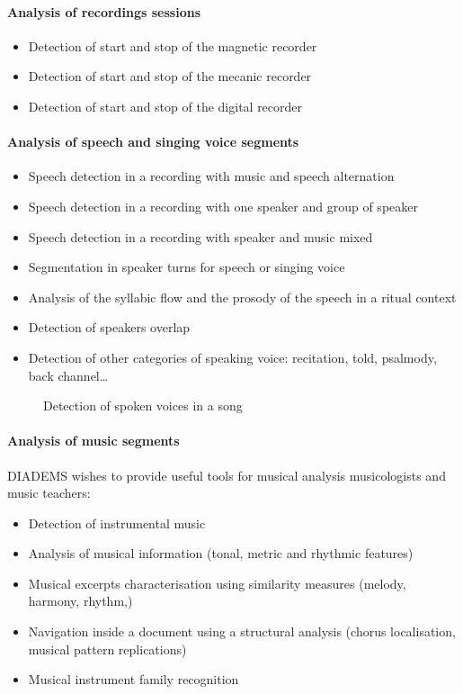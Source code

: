 \documentclass{sig-alternate}
\begin{document}
\paragraph{Analysis of recordings sessions}
\begin{itemize}
\item Detection of start and stop of the magnetic recorder
\item Detection of start and stop of the mecanic recorder
\item Detection of start and stop of the digital recorder
\end{itemize}
\paragraph{Analysis of speech and singing voice segments}
\begin{itemize}
\item Speech detection in a recording with music and speech
  alternation
\item Speech detection in a recording with one speaker and group of
  speaker
\item Speech detection in a recording with speaker and music mixed
\item Segmentation in speaker turns for speech or singing voice
\item Analysis of the syllabic flow and the prosody of the speech in a
  ritual context
\item Detection of speakers overlap
\item Detection of other categories of speaking voice: recitation,
  told, psalmody, back channel…
\end{itemize}

\begin{figure}
  \centering
  
  \caption{Detection of spoken voices in a song}
  \label{fig:speech_detection}
\end{figure}

\paragraph{Analysis of music segments}

DIADEMS wishes to provide useful tools for musical analysis musicologists and music teachers:
\begin{itemize}
\item Detection of instrumental music
\item Analysis of musical information (tonal, metric and rhythmic
  features)
\item Musical excerpts characterisation using similarity measures
  (melody, harmony, rhythm,)
\item Navigation inside a document using a structural analysis (chorus
  localisation, musical pattern replications)
\item Musical instrument family recognition
\end{itemize}
\end{document}
